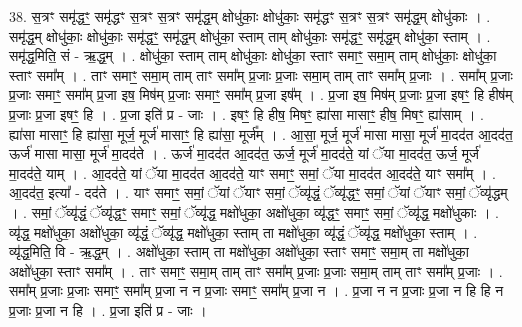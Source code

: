 \documentclass[17pt]{extarticle}
\begin{document}
38. स॒त्रꣳ समृ॑द्धꣳ॒॒ समृ॑द्धꣳ स॒त्रꣳ स॒त्रꣳ समृ॑द्ध॒म् क्षोधु॑काः॒ क्षोधु॑काः॒ समृ॑द्धꣳ स॒त्रꣳ स॒त्रꣳ समृ॑द्ध॒म् क्षोधु॑काः । . समृ॑द्ध॒म् क्षोधु॑काः॒ क्षोधु॑काः॒ समृ॑द्धꣳ॒॒ समृ॑द्ध॒म् क्षोधु॑का॒ स्ताम् ताम् क्षोधु॑काः॒ समृ॑द्धꣳ॒॒ समृ॑द्ध॒म् क्षोधु॑का॒ स्ताम् । . समृ॑द्ध॒मिति॒ सं - ऋ॒द्ध॒म् । . क्षोधु॑का॒ स्ताम् ताम् क्षोधु॑काः॒ क्षोधु॑का॒ स्ताꣳ समाꣳ॒॒ समा॒म् ताम् क्षोधु॑काः॒ क्षोधु॑का॒ स्ताꣳ समा᳚म् । . ताꣳ समाꣳ॒॒ समा॒म् ताम् ताꣳ समा᳚म् प्र॒जाः प्र॒जाः समा॒म् ताम् ताꣳ समा᳚म् प्र॒जाः । . समा᳚म् प्र॒जाः प्र॒जाः समाꣳ॒॒ समा᳚म् प्र॒जा इष॒ मिष॑म् प्र॒जाः समाꣳ॒॒ समा᳚म् प्र॒जा इष᳚म् । . प्र॒जा इष॒ मिष॑म् प्र॒जाः प्र॒जा इषꣳ॒॒ हि हीष॑म् प्र॒जाः प्र॒जा इषꣳ॒॒ हि । . प्र॒जा इति॑ प्र - जाः । . इषꣳ॒॒ हि हीष॒ मिषꣳ॒॒ ह्या॑सा मासाꣳ॒॒ हीष॒ मिषꣳ॒॒ ह्या॑साम् । . ह्या॑सा मासाꣳ॒॒ हि ह्या॑सा॒ मूर्ज॒ मूर्ज॑ मासाꣳ॒॒ हि ह्या॑सा॒ मूर्ज᳚म् । . आ॒सा॒ मूर्ज॒ मूर्ज॑ मासा मासा॒ मूर्ज॑ मा॒दद॑त आ॒दद॑त॒ ऊर्ज॑ मासा मासा॒ मूर्ज॑ मा॒दद॑ते । . ऊर्ज॑ मा॒दद॑त आ॒दद॑त॒ ऊर्ज॒ मूर्ज॑ मा॒दद॑ते॒ यां ॅया मा॒दद॑त॒ ऊर्ज॒ मूर्ज॑ मा॒दद॑ते॒ याम् । . आ॒दद॑ते॒ यां ॅया मा॒दद॑त आ॒दद॑ते॒ याꣳ समाꣳ॒॒ समां॒ ॅया मा॒दद॑त आ॒दद॑ते॒ याꣳ समा᳚म् । . आ॒दद॑त॒ इत्या᳚ - दद॑ते । . याꣳ समाꣳ॒॒ समां॒ ॅयां ॅयाꣳ समां॒ ॅव्यृ॑द्धं॒ ॅव्यृ॑द्धꣳ॒॒ समां॒ ॅयां ॅयाꣳ समां॒ ॅव्यृ॑द्धम् । . समां॒ ॅव्यृ॑द्धं॒ ॅव्यृ॑द्धꣳ॒॒ समाꣳ॒॒ समां॒ ॅव्यृ॑द्ध॒ मक्षो॑धुका॒ अक्षो॑धुका॒ व्यृ॑द्धꣳ॒॒ समाꣳ॒॒ समां॒ ॅव्यृ॑द्ध॒ मक्षो॑धुकाः । . व्यृ॑द्ध॒ मक्षो॑धुका॒ अक्षो॑धुका॒ व्यृ॑द्धं॒ ॅव्यृ॑द्ध॒ मक्षो॑धुका॒ स्ताम् ता मक्षो॑धुका॒ व्यृ॑द्धं॒ ॅव्यृ॑द्ध॒ मक्षो॑धुका॒ स्ताम् । . व्यृ॑द्ध॒मिति॒ वि - ऋ॒द्ध॒म् । . अक्षो॑धुका॒ स्ताम् ता मक्षो॑धुका॒ अक्षो॑धुका॒ स्ताꣳ समाꣳ॒॒ समा॒म् ता मक्षो॑धुका॒ अक्षो॑धुका॒ स्ताꣳ समा᳚म् । . ताꣳ समाꣳ॒॒ समा॒म् ताम् ताꣳ समा᳚म् प्र॒जाः प्र॒जाः समा॒म् ताम् ताꣳ समा᳚म् प्र॒जाः । . समा᳚म् प्र॒जाः प्र॒जाः समाꣳ॒॒ समा᳚म् प्र॒जा न न प्र॒जाः समाꣳ॒॒ समा᳚म् प्र॒जा न । . प्र॒जा न न प्र॒जाः प्र॒जा न हि हि न प्र॒जाः प्र॒जा न हि । . प्र॒जा इति॑ प्र - जाः । \newline
\pagebreak
{}
\end{document}
